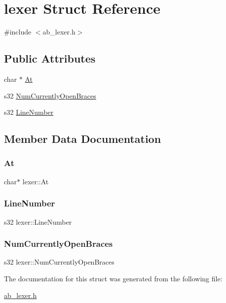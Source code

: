 \hypertarget{structlexer}{}\section{lexer Struct Reference}
\label{structlexer}


{\ttfamily \#include $<$ab\+\_\+lexer.\+h$>$}

\subsection*{Public Attributes}
\begin{DoxyCompactItemize}
\item 
char $\ast$ \hyperlink{structlexer_a3a775702427156530a8b1c1f426a904d}{At}
\item 
s32 \hyperlink{structlexer_a467733563699eba46da6c518ae3923eb}{Num\+Currently\+Open\+Braces}
\item 
s32 \hyperlink{structlexer_a252d45a538fbf3a3b5a22c294061651c}{Line\+Number}
\end{DoxyCompactItemize}


\subsection{Member Data Documentation}
\mbox{\label{structlexer_a3a775702427156530a8b1c1f426a904d}} 
\subsubsection{\texorpdfstring{At}{At}}
{\footnotesize\ttfamily char$\ast$ lexer\+::\+At}

\mbox{\label{structlexer_a252d45a538fbf3a3b5a22c294061651c}} 
\subsubsection{\texorpdfstring{Line\+Number}{LineNumber}}
{\footnotesize\ttfamily s32 lexer\+::\+Line\+Number}

\mbox{\label{structlexer_a467733563699eba46da6c518ae3923eb}} 
\subsubsection{\texorpdfstring{Num\+Currently\+Open\+Braces}{NumCurrentlyOpenBraces}}
{\footnotesize\ttfamily s32 lexer\+::\+Num\+Currently\+Open\+Braces}



The documentation for this struct was generated from the following file\+:\begin{DoxyCompactItemize}
\item 
\hyperlink{ab__lexer_8h}{ab\+\_\+lexer.\+h}\end{DoxyCompactItemize}
